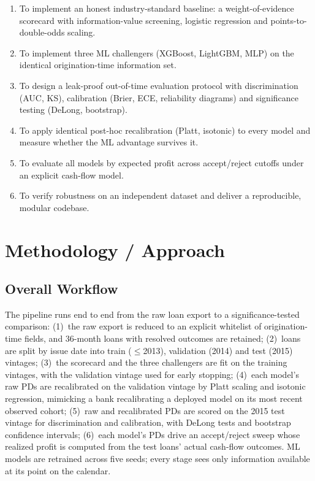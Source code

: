 \documentclass[a4paper,twocolumn,10pt]{article}
\begin{document}
\begin{enumerate}
  \item To implement an honest industry-standard baseline: a weight-of-evidence scorecard with information-value screening, logistic regression and points-to-double-odds scaling.
  \item To implement three ML challengers (XGBoost, LightGBM, MLP) on the identical origination-time information set.
  \item To design a leak-proof out-of-time evaluation protocol with discrimination (AUC, KS), calibration (Brier, ECE, reliability diagrams) and significance testing (DeLong, bootstrap).
  \item To apply identical post-hoc recalibration (Platt, isotonic) to every model and measure whether the ML advantage survives it.
  \item To evaluate all models by expected profit across accept/reject cutoffs under an explicit cash-flow model.
  \item To verify robustness on an independent dataset and deliver a reproducible, modular codebase.
\end{enumerate}

\section{Methodology / Approach}

\subsection{Overall Workflow}

The pipeline runs end to end from the raw loan export to a significance-tested comparison: (1)~the raw export is reduced to an explicit whitelist of origination-time fields, and 36-month loans with resolved outcomes are retained; (2)~loans are split by issue date into train ($\le$2013), validation (2014) and test (2015) vintages; (3)~the scorecard and the three challengers are fit on the training vintages, with the validation vintage used for early stopping; (4)~each model's raw PDs are recalibrated on the validation vintage by Platt scaling and isotonic regression, mimicking a bank recalibrating a deployed model on its most recent observed cohort; (5)~raw and recalibrated PDs are scored on the 2015 test vintage for discrimination and calibration, with DeLong tests and bootstrap confidence intervals; (6)~each model's PDs drive an accept/reject sweep whose realized profit is computed from the test loans' actual cash-flow outcomes. ML models are retrained across five seeds; every stage sees only information available at its point on the calendar.
\end{document}
